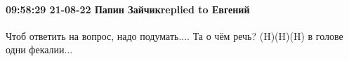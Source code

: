  
 
 
 
 

\paragraph{09:58:29 21-08-22 Папин Зайчикreplied to Евгений}

Чтоб ответить на вопрос, надо подумать....
Та о чём речь? (H)﻿(H)﻿(H)﻿ в голове одни фекалии...
